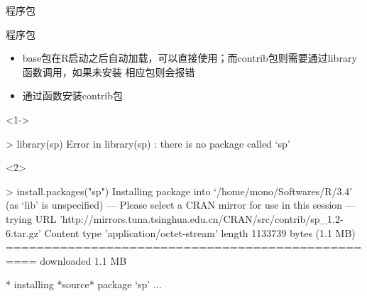\documentclass{beamerthemeMono}
\begin{document}
\begin{frame}[t]{\subsecname}{程序包}
\begin{overlayarea}{\textwidth}{\textheight}
\end{overlayarea}
\end{frame}

\begin{frame}[t,fragile]{\subsecname}{程序包}
  \begin{itemize}
     \item base包在R启动之后自动加载，可以直接使用；而contrib包则需要通过library函数调用，如果未安装
               相应包则会报错
     \item 通过函数安装contrib包
  \end{itemize}

\begin{overlayarea}{\textwidth}{\textheight}
\begin{onlyenv}<1->
\begin{rcode}
> library(sp)
Error in library(sp) : there is no package called ‘sp’
\end{rcode}
\end{onlyenv}

\begin{onlyenv}<2>
\begin{rcode}
> install.packages("sp")
Installing package into ‘/home/mono/Softwares/R/3.4’
(as ‘lib’ is unspecified)
--- Please select a CRAN mirror for use in this session ---
trying URL 'http://mirrors.tuna.tsinghua.edu.cn/CRAN/src/contrib/sp_1.2-6.tar.gz'
Content type 'application/octet-stream' length 1133739 bytes (1.1 MB)
==================================================
downloaded 1.1 MB

* installing *source* package ‘sp’ ...
\end{rcode}
\end{onlyenv}
\end{overlayarea}
\end{frame}
\end{document}
